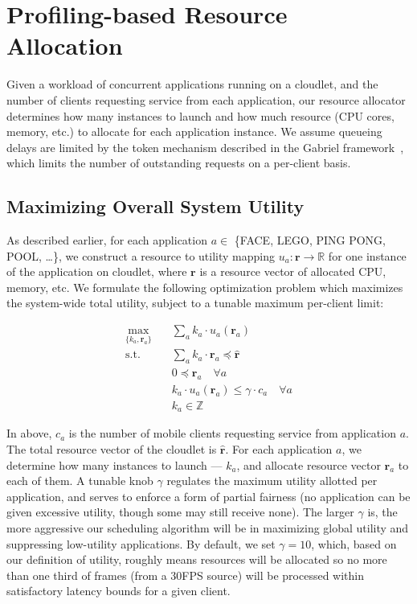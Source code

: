 \section{Profiling-based Resource Allocation}

Given a workload of concurrent applications running on a cloudlet, and
the number of clients requesting service from each application, our
resource allocator determines how many instances to launch and how
much resource (CPU cores, memory, etc.) to allocate for each
application instance.  We assume queueing delays are limited by the
token mechanism described in the Gabriel framework~\cite{ha2014towards},
which limits the number of outstanding requests on a per-client basis.


\subsection{Maximizing Overall System Utility}

As described earlier, for each application $a \in $ \{FACE, LEGO, PING PONG, POOL, \ldots \}, 
we construct a resource to utility mapping
$u_a: \mathbf{r} \rightarrow \mathbb{R}$ for one instance of the application on cloudlet, 
where $\mathbf{r}$ is a resource vector of allocated CPU, memory, etc. We formulate the 
following optimization problem which maximizes the system-wide total utility,
subject to a tunable maximum per-client limit:

\begin{equation}
  \begin{aligned}
  \max_{\{k_a, \mathbf{r}_a\}} \quad & \sum_a{k_a \cdot u_a(\mathbf{r}_a)} \\
  \textrm{s.t.} \quad & \sum_a k_a \cdot \mathbf{r}_a \preccurlyeq \hat{\mathbf{r}} \\
      & 0 \preccurlyeq \mathbf{r}_a  \quad \forall a \\
      & k_a \cdot u_a(\mathbf{r}_a) \le \gamma \cdot c_a \quad \forall a \\
      & k_a \in \mathbb{Z}
  \end{aligned}
  \end{equation}

In above, $c_a$ is the number of mobile clients requesting service from application $a$.
The total resource vector of the cloudlet is  $\hat{\mathbf{r}}$. 
 For each application $a$, we determine how many instances to launch --- $k_a$, and 
allocate resource vector $\mathbf{r}_a$ to each of them.
A tunable knob $\gamma$ regulates the maximum utility allotted 
per application, and serves to enforce a form of partial fairness (no application
can be given excessive utility, though some may still receive none). 
The larger $\gamma$ is, the more aggressive our scheduling algorithm
will be in maximizing global utility and
suppressing low-utility applications. 
By default, we set $\gamma=10$, which, based on our definition of
utility, roughly means resources will be allocated so 
no more than one third of frames (from a 30FPS source) 
will be processed within satisfactory latency bounds for a given
client.

